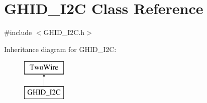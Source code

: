 \hypertarget{class_g_h_i_d___i2_c}{\section{\-G\-H\-I\-D\-\_\-\-I2\-C \-Class \-Reference}
\label{class_g_h_i_d___i2_c}
}


{\ttfamily \#include $<$\-G\-H\-I\-D\-\_\-\-I2\-C.\-h$>$}

\-Inheritance diagram for \-G\-H\-I\-D\-\_\-\-I2\-C\-:\begin{figure}[H]
\begin{center}
\leavevmode
\includegraphics[height=2.000000cm]{class_g_h_i_d___i2_c}
\end{center}
\end{figure}
